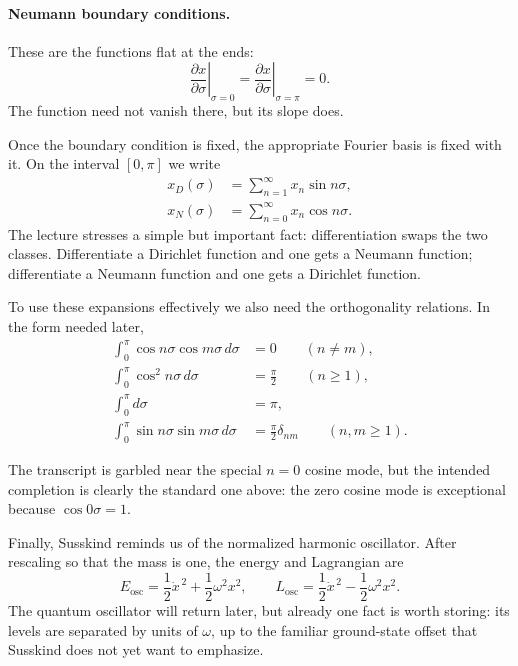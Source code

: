 \paragraph{Neumann boundary conditions.}
These are the functions flat at the ends:
\begin{equation}
\left.\frac{\partial x}{\partial \sigma}\right|_{\sigma=0}
=
\left.\frac{\partial x}{\partial \sigma}\right|_{\sigma=\pi}
=0.
\end{equation}
The function need not vanish there, but its slope does.

Once the boundary condition is fixed, the appropriate Fourier basis is fixed with it. On the interval \([0,\pi]\) we write
\begin{align}
x_D(\sigma) &= \sum_{n=1}^{\infty} x_n \sin n\sigma, \\
x_N(\sigma) &= \sum_{n=0}^{\infty} x_n \cos n\sigma .
\end{align}
The lecture stresses a simple but important fact: differentiation swaps the two classes. Differentiate a Dirichlet function and one gets a Neumann function; differentiate a Neumann function and one gets a Dirichlet function.

To use these expansions effectively we also need the orthogonality relations. In the form needed later,
\begin{align}
\int_0^\pi \cos n\sigma \cos m\sigma\,d\sigma &= 0 \qquad (n\neq m), \\
\int_0^\pi \cos^2 n\sigma\,d\sigma &= \frac{\pi}{2} \qquad (n\geq 1), \\
\int_0^\pi d\sigma &= \pi, \\
\int_0^\pi \sin n\sigma \sin m\sigma\,d\sigma &= \frac{\pi}{2}\delta_{nm} \qquad (n,m\geq 1).
\end{align}

\begin{remark}
The transcript is garbled near the special \(n=0\) cosine mode, but the intended completion is clearly the standard one above: the zero cosine mode is exceptional because \(\cos 0\sigma=1\).
\end{remark}

Finally, Susskind reminds us of the normalized harmonic oscillator. After rescaling so that the mass is one, the energy and Lagrangian are
\begin{equation}
E_{\mathrm{osc}}=\frac{1}{2}\dot x^{\,2}+\frac{1}{2}\omega^2 x^2,
\qquad
L_{\mathrm{osc}}=\frac{1}{2}\dot x^{\,2}-\frac{1}{2}\omega^2 x^2.
\end{equation}
The quantum oscillator will return later, but already one fact is worth storing: its levels are separated by units of \(\omega\), up to the familiar ground-state offset that Susskind does not yet want to emphasize.

